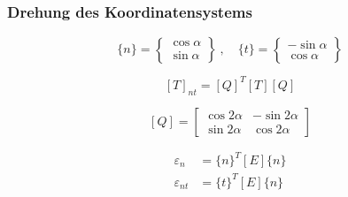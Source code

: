 \documentclass{article}
\begin{document}
\begin{multicols*}{4}
				\subsubsection{Drehung des Koordinatensystems} %
					\[
						\{n\} = \left\{\begin{array}{r}
							\cos \alpha \\
							\sin \alpha 
						\end{array}\right\}
						\ ,\quad
						\{t\} = \left\{\begin{array}{r}
							-\sin \alpha \\
							\cos \alpha 
						\end{array}\right\}
					\]
					
					\[
						[T]_{nt} = [Q]^T [T] [Q]
					\]
					
					\[
						[Q] = \left[\begin{array}{rr}
							\cos 2 \alpha & - \sin 2 \alpha \\
							\sin 2 \alpha & \cos 2 \alpha
						\end{array}\right]
					\]
					
					\begin{align*}
						\varepsilon_n &= \{n\}^T [E] \{n\} \\
						\varepsilon_{nt} &= \{t\}^T [E] \{n\}
					\end{align*}

\end{multicols*}
\end{document}
